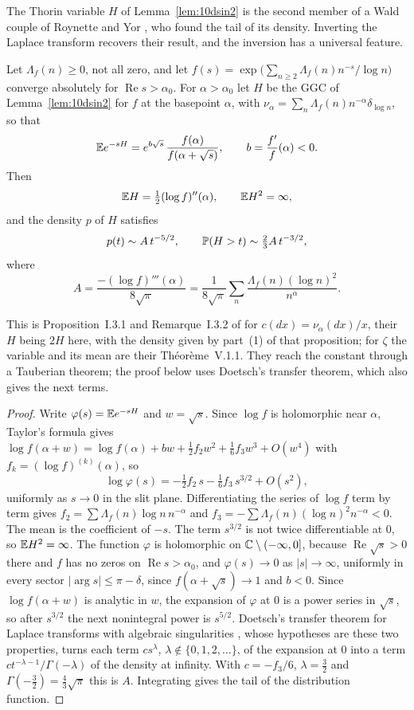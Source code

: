 The Thorin variable $H$ of Lemma~\ref{lem:10dsin2} is the second member of a Wald couple of Roynette and Yor \cite{roynetteyor2005}, who found the tail of its density. Inverting the Laplace transform recovers their result, and the inversion has a universal feature.

\begin{theorem}\label{thm:laptail}
Let $\Lambda_f(n)\ge0$, not all zero, and let $f(s)=\exp\bigl(\sum_{n\ge2}\Lambda_f(n)n^{-s}/\log n\bigr)$ converge absolutely for $\operatorname{Re}s>\alpha_0$. For $\alpha>\alpha_0$ let $H$ be the GGC of Lemma~\ref{lem:10dsin2} for $f$ at the basepoint $\alpha$, with $\nu_\alpha=\sum_n\Lambda_f(n)n^{-\alpha}\delta_{\log n}$, so that
\[
\mathbb{E} e^{-sH}=e^{b\sqrt s}\,\frac{f(\alpha)}{f(\alpha+\sqrt s)},\qquad b=\frac{f'}f(\alpha)<0 .
\]
Then
\[
\mathbb{E} H=\tfrac12(\log f)''(\alpha),\qquad \mathbb{E} H^2=\infty,
\]
and the density $p$ of $H$ satisfies
\[
p(t)\sim A\,t^{-5/2},\qquad \mathbb{P}(H>t)\sim\tfrac23A\,t^{-3/2},
\]
where
\[
A=\frac{-(\log f)'''(\alpha)}{8\sqrt\pi}=\frac1{8\sqrt\pi}\sum_n\frac{\Lambda_f(n)(\log n)^2}{n^\alpha}.
\]
\end{theorem}

This is Proposition~I.3.1 and Remarque~I.3.2 of \cite{roynetteyor2005} for $c(dx)=\nu_\alpha(dx)/x$, their $H$ being $2H$ here, with the density given by part~(1) of that proposition; for $\zeta$ the variable and its mean are their Th\'eor\`eme~V.1.1. They reach the constant through a Tauberian theorem; the proof below uses Doetsch's transfer theorem, which also gives the next terms.

\begin{proof}
Write $\varphi(s)=\mathbb{E} e^{-sH}$ and $w=\sqrt s$. Since $\log f$ is holomorphic near $\alpha$, Taylor's formula gives $\log f(\alpha+w)=\log f(\alpha)+bw+\frac12f_2w^2+\frac16f_3w^3+O(w^4)$ with $f_k=(\log f)^{(k)}(\alpha)$, so
\[
\log\varphi(s)=-\tfrac12f_2\,s-\tfrac16f_3\,s^{3/2}+O(s^2),
\]
uniformly as $s\to0$ in the slit plane. Differentiating the series of $\log f$ term by term gives $f_2=\sum\Lambda_f(n)\log n\,n^{-\alpha}$ and $f_3=-\sum\Lambda_f(n)(\log n)^2n^{-\alpha}<0$. The mean is the coefficient of $-s$. The term $s^{3/2}$ is not twice differentiable at $0$, so $\mathbb{E} H^2=\infty$. The function $\varphi$ is holomorphic on $\mathbb{C}\setminus(-\infty,0]$, because $\operatorname{Re}\sqrt s>0$ there and $f$ has no zeros on $\operatorname{Re}s>\alpha_0$, and $\varphi(s)\to0$ as $|s|\to\infty$, uniformly in every sector $|\arg s|\le\pi-\delta$, since $f(\alpha+\sqrt s)\to1$ and $b<0$. Since $\log f(\alpha+w)$ is analytic in $w$, the expansion of $\varphi$ at $0$ is a power series in $\sqrt s$, so after $s^{3/2}$ the next nonintegral power is $s^{5/2}$. Doetsch's transfer theorem for Laplace transforms with algebraic singularities \cite{doetsch1974}, whose hypotheses are these two properties, turns each term $cs^\lambda$, $\lambda\notin\{0,1,2,\dots\}$, of the expansion at $0$ into a term $ct^{-\lambda-1}/\Gamma(-\lambda)$ of the density at infinity. With $c=-f_3/6$, $\lambda=\frac32$ and $\Gamma(-\frac32)=\frac43\sqrt\pi$ this is $A$. Integrating gives the tail of the distribution function.
\end{proof}

